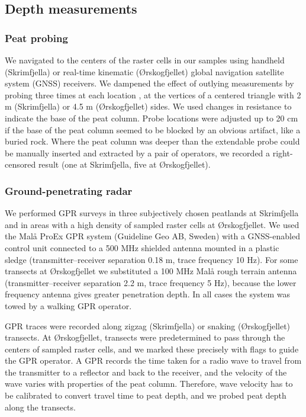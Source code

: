 \documentclass[soil, manuscript]{copernicus}
\begin{document}
\subsection{Depth measurements} \label{sec:depth-measurements}

\subsubsection{Peat probing}

We navigated to the centers of the raster cells in our samples using handheld (Skrimfjella) or real-time kinematic (Ørskogfjellet) global navigation satellite system (GNSS) receivers.
We dampened the effect of outlying measurements by probing three times at each location \citep{parryEvaluatingApproachesEstimating2014}, at the vertices of a centered triangle with 2 m (Skrimfjella) or 4.5 m (Ørskogfjellet) sides.
We used changes in resistance to indicate the base of the peat column.
Probe locations were adjusted up to 20 cm if the base of the peat column seemed to be blocked by an obvious artifact, like a buried rock.
Where the peat column was deeper than the extendable probe could be manually inserted and extracted by a pair of operators, we recorded a right-censored result (one at Skrimfjella, five at Ørskogfjellet).

\subsubsection{Ground-penetrating radar}

We performed GPR surveys in three subjectively chosen peatlands at Skrimfjella and in areas with a high density of sampled raster cells at Ørskogfjellet.
We used the Malå ProEx GPR system (Guideline Geo AB, Sweden) with a GNSS-enabled control unit connected to a 500 MHz shielded antenna mounted in a plastic sledge (transmitter--receiver separation 0.18 m, trace frequency 10 Hz).
For some transects at Ørskogfjellet we substituted a 100 MHz Malå rough terrain antenna (transmitter--receiver separation 2.2 m, trace frequency 5 Hz), because the lower frequency antenna gives greater penetration depth.
In all cases the system was towed by a walking GPR operator.

GPR traces were recorded along zigzag (Skrimfjella) or snaking (Ørskogfjellet) transects.
At Ørskogfjellet, transects were predetermined to pass through the centers of sampled raster cells, and we marked these precisely with flags to guide the GPR operator.
A GPR records the time taken for a radio wave to travel from the transmitter to a reflector and back to the receiver, and the velocity of the wave varies with properties of the peat column.
Therefore, wave velocity has to be calibrated to convert travel time to peat depth, and we probed peat depth along the transects.
\end{document}
